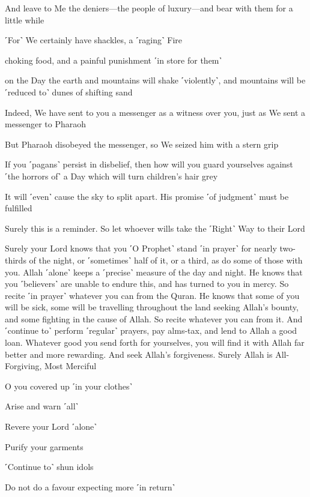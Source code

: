 And leave to Me the deniers—the people of luxury—and bear with them for a little while

˹For˺ We certainly have shackles, a ˹raging˺ Fire

choking food, and a painful punishment ˹in store for them˺

on the Day the earth and mountains will shake ˹violently˺, and mountains will be ˹reduced to˺ dunes of shifting sand

Indeed, We have sent to you a messenger as a witness over you, just as We sent a messenger to Pharaoh

But Pharaoh disobeyed the messenger, so We seized him with a stern grip

If you ˹pagans˺ persist in disbelief, then how will you guard yourselves against ˹the horrors of˺ a Day which will turn children’s hair grey

It will ˹even˺ cause the sky to split apart. His promise ˹of judgment˺ must be fulfilled

Surely this is a reminder. So let whoever wills take the ˹Right˺ Way to their Lord

Surely your Lord knows that you ˹O Prophet˺ stand ˹in prayer˺ for nearly two-thirds of the night, or ˹sometimes˺ half of it, or a third, as do some of those with you. Allah ˹alone˺ keeps a ˹precise˺ measure of the day and night. He knows that you ˹believers˺ are unable to endure this, and has turned to you in mercy. So recite ˹in prayer˺ whatever you can from the Quran. He knows that some of you will be sick, some will be travelling throughout the land seeking Allah’s bounty, and some fighting in the cause of Allah. So recite whatever you can from it. And ˹continue to˺ perform ˹regular˺ prayers, pay alms-tax, and lend to Allah a good loan. Whatever good you send forth for yourselves, you will find it with Allah far better and more rewarding. And seek Allah’s forgiveness. Surely Allah is All-Forgiving, Most Merciful

O you covered up ˹in your clothes˺

Arise and warn ˹all˺

Revere your Lord ˹alone˺

Purify your garments

˹Continue to˺ shun idols

Do not do a favour expecting more ˹in return˺


